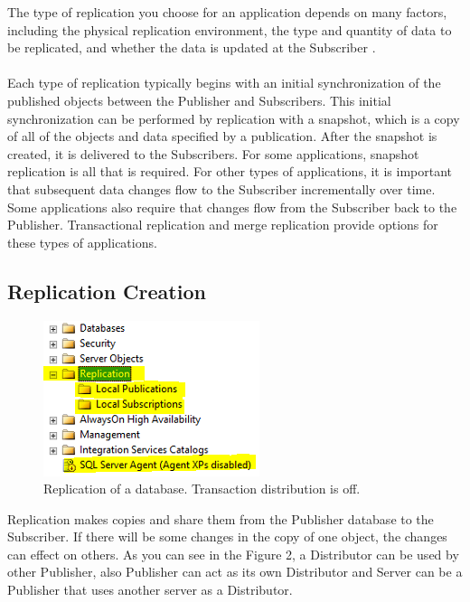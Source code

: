 \documentclass[english]{article}
\begin{document}
The type of replication you choose for an application depends on many factors, including the physical replication environment, the type and quantity of data to be replicated, and whether the data is updated at the Subscriber \cite{typesRep}.\\\\
Each type of replication typically begins with an initial synchronization of the published objects between the Publisher and Subscribers. This initial synchronization can be performed by replication with a snapshot, which is a copy of all of the objects and data specified by a publication. After the snapshot is created, it is delivered to the Subscribers. For some applications, snapshot replication is all that is required. For other types of applications, it is important that subsequent data changes flow to the Subscriber incrementally over time. Some applications also require that changes flow from the Subscriber back to the Publisher. Transactional replication and merge replication provide options for these types of applications.
\subsection{Replication Creation}
\begin{figure}[H]
\centerline{\includegraphics[scale=1]{administration/rep/1}}
\caption{Replication of a database. Transaction distribution is off.}
\end{figure}
Replication makes copies and share them from the Publisher database to the Subscriber. If there will be some changes in the copy of one object, the changes can effect on others. As you can see in the Figure 2, a Distributor can be used by other Publisher, also Publisher can act as its own Distributor and Server can be a Publisher that uses another server as a Distributor.\\\\
\end{document}
